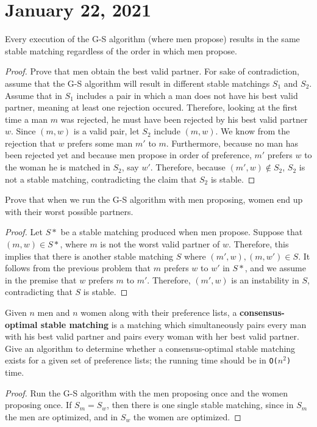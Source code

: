 \documentclass[11pt]{article}
\begin{document}
\section{January 22, 2021}
\begin{exmp}
Every execution of the G-S algorithm (where men propose) results in the same stable matching regardless of the order in which men propose.
\end{exmp}
\begin{proof}
Prove that men obtain the best valid partner. For sake of contradiction, assume that the G-S algorithm will result in different stable matchings $S_1$ and $S_2$. Assume that in $S_1$ includes a pair in which a man does not have his best valid partner, meaning at least one rejection occured. Therefore, looking at the first time a man $m$ was rejected, he must have been rejected by his best valid partner $w$. Since $(m,w)$ is a valid pair, let $S_2$ include $(m,w)$. We know from the rejection that $w$ prefers some man $m'$ to $m$. Furthermore, because no man has been rejected yet and because men propose in order of preference, $m'$ prefers $w$ to the woman he is matched in $S_2$, say $w'$. Therefore, because $(m', w) \not \in S_2$, $S_2$ is not a stable matching, contradicting the claim that $S_2$ is stable.
\end{proof}
\begin{exmp}
Prove that when we run the G-S algorithm with men proposing, women end up with their worst possible partners.
\end{exmp}
\begin{proof}
Let $S*$ be a stable matching produced when men propose. Suppose that $(m,w) \in S*$, where $m$ is not the worst valid partner of $w$. Therefore, this implies that there is another stable matching $S$ where $(m', w), (m, w') \in S$. It follows from the previous problem that $m$ prefers $w$ to $w'$ in $S*$, and we assume in the premise that $w$ prefers $m$ to $m'$. Therefore, $(m',w)$ is an instability in $S$, contradicting that $S$ is stable.
\end{proof}
\begin{exmp}
Given $n$ men and $n$ women along with their preference lists, a \textbf{consensus-optimal stable matching} is a matching which simultaneously pairs every man with his best valid partner and pairs every woman with her best valid partner. Give an algorithm to determine whether a consensus-optimal stable matching exists for a given set of preference lists; the running time should be in \texttt{O($n^2$)} time.
\end{exmp}
\begin{proof}
Run the G-S algorithm with the men proposing once and the women proposing once. If $S_m = S_w$, then there is one single stable matching, since in $S_m$ the men are optimized, and in $S_w$ the women are optimized.
\end{proof}
\end{document}
